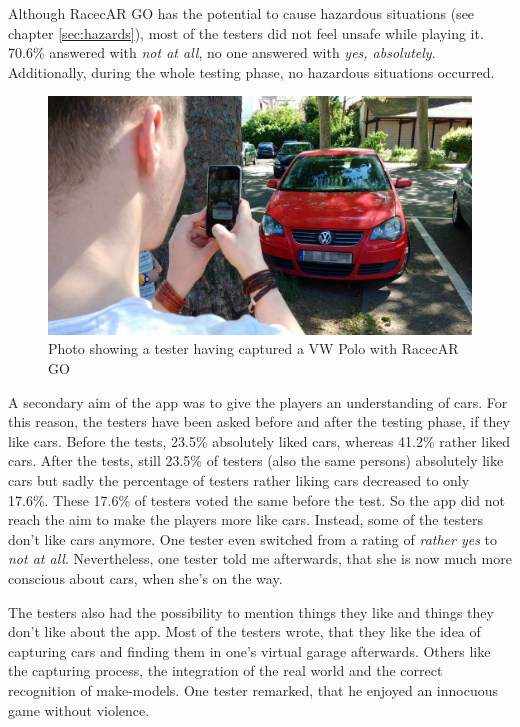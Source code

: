 Although RacecAR GO has the potential to cause hazardous situations (see chapter \ref{sec:hazards}), most of the testers did not feel unsafe while playing it. 70.6\% answered with \emph{not at all}, no one answered with \emph{yes, absolutely}. Additionally, during the whole testing phase, no hazardous situations occurred.
\begin{figure}[btph]
  \centering
        \includegraphics[width=.95\linewidth]{gfx/eval5}
        \caption{Photo showing a tester having captured a VW Polo with RacecAR GO}
        \label{fig:eval5}
\end{figure}

A secondary aim of the app was to give the players an understanding of cars. For this reason, the testers have been asked before and after the testing phase, if they like cars. Before the tests, 23.5\% absolutely liked cars, whereas 41.2\% rather liked cars. After the tests, still 23.5\% of testers (also the same persons) absolutely like cars but sadly the percentage of testers rather liking cars decreased to only 17.6\%. These 17.6\% of testers voted the same before the test. So the app did not reach the aim to make the players more like cars. Instead, some of the testers don't like cars anymore. One tester even switched from a rating of \emph{rather yes} to \emph{not at all}. Nevertheless, one tester told me afterwards, that she is now much more conscious about cars, when she's on the way.

The testers also had the possibility to mention things they like and things they don't like about the app. Most of the testers wrote, that they like the idea of capturing cars and finding them in one's virtual garage afterwards. Others like the capturing process, the integration of the real world and the correct recognition of make-models. One tester remarked, that he enjoyed an innocuous game without violence.

